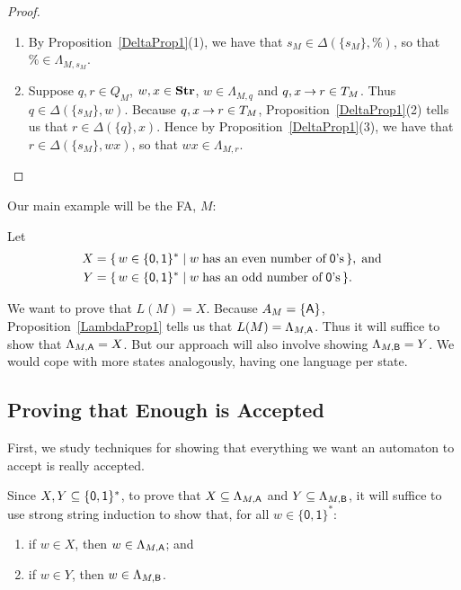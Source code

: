 \begin{proof}
\begin{enumerate}[(1)]
\item By Proposition~\ref{DeltaProp1}(1), we have
  that $s_M\in\Delta(\{s_M\},\%)$, so that $\%\in\Lambda_{M,s_M}$.

\item Suppose $q,r\in Q_M$, $w,x\in\mathbf{Str}$, $w\in\Lambda_{M,q}$ and
  $q,x\mathbin{\to} r\in T_M$.  Thus $q\in\Delta(\{s_M\},w)$.  Because
  ${q,x\mathbin{\to} r}\in T_M$, Proposition~\ref{DeltaProp1}(2) tells us that
  $r\in\Delta(\{q\},x)$.  Hence by Proposition~\ref{DeltaProp1}(3), we
  have that ${r}\in\Delta(\{s_M\},wx)$, so that
  ${wx}\in\Lambda_{M,{r}}$.
\end{enumerate}
\end{proof}

Our main example will be the FA, $M$:
\begin{center}

\end{center}
Let
\begin{align*}
X &= \{ \, w\in\{\mathsf{0,1}\}^* \mid w\;\allowbreak\mbox{has an even number of}\allowbreak\;
\mathsf{0}\allowbreak\mbox{'s}\allowbreak \, \} , \;\allowbreak\mbox{and}\allowbreak\; \\
Y &= \{ \, w\in\{\mathsf{0,1}\}^* \mid w\;\allowbreak\mbox{has an odd number of}\allowbreak\;
\mathsf{0}\allowbreak\mbox{'s}\allowbreak \, \} .
\end{align*}

We want to prove that $L(M) = X$.  Because $A_M=\{\mathsf{A}\}$,
Proposition~\ref{LambdaProp1} tells us that $L(M)=\Lambda_{M,\mathsf{A}}$.
Thus it will suffice to show that $\Lambda_{M,\mathsf{A}} = X$.  But our
approach will also involve showing $\Lambda_{M,\mathsf{B}} = Y$.  We would
cope with more states analogously, having one language per state.

\subsection{Proving that Enough is Accepted}

First, we study techniques for showing that everything we want an
automaton to accept is really accepted.

Since $X,Y\subseteq\{\mathsf{0,1}\}^*$, to prove that
$X\subseteq\Lambda_{M,\mathsf{A}}$ and $Y\subseteq\Lambda_{M,\mathsf{B}}$, it will suffice
to use strong string induction to show that, for all
$w\in\mathsf{\{0,1\}^*}$:
\begin{enumerate}[\quad(A)]
\item if $w\in X$, then $w\in\Lambda_{M,\mathsf{A}}$; and

\item if $w\in Y$, then $w\in\Lambda_{M,\mathsf{B}}$.
\end{enumerate}

